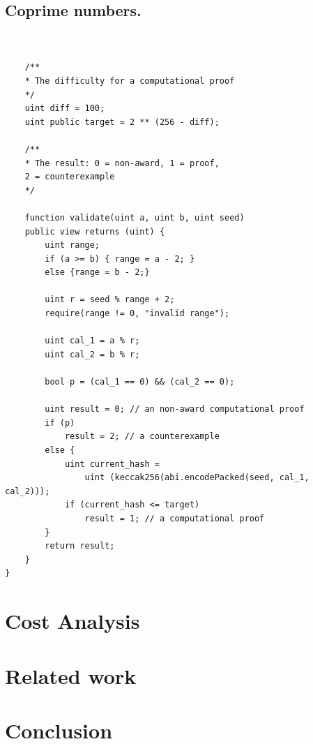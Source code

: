 \documentclass[runningheads]{llncs}
\begin{document}
\subsection{Coprime numbers.}


\begin{lstlisting}[numbers=none]


    /**
    * The difficulty for a computational proof
    */
    uint diff = 100;
    uint public target = 2 ** (256 - diff); 

    /**
    * The result: 0 = non-award, 1 = proof, 
    2 = counterexample
    */

    function validate(uint a, uint b, uint seed)
    public view returns (uint) {
        uint range;
        if (a >= b) { range = a - 2; }
        else {range = b - 2;}
        
        uint r = seed % range + 2;
        require(range != 0, "invalid range");

        uint cal_1 = a % r;
        uint cal_2 = b % r;
        
        bool p = (cal_1 == 0) && (cal_2 == 0);

        uint result = 0; // an non-award computational proof 
        if (p)  
            result = 2; // a counterexample
        else {
            uint current_hash = 
                uint (keccak256(abi.encodePacked(seed, cal_1, cal_2)));
            if (current_hash <= target) 
                result = 1; // a computational proof      
        }              
        return result;           
    }
}

\end{lstlisting}


\section{Cost Analysis}
\section{Related work}
\section{Conclusion}

%


\newpage


\end{document}
